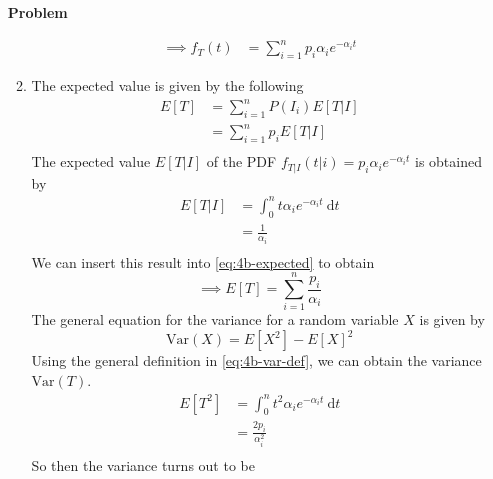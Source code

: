 \documentclass[12pt]{article}
\newenvironment{Ex}{\textbf{Problem}\vspace{.75em}\\}{}
\newcommand{\dd}[1]{\:\mathrm{d}{#1}}
\begin{document}
\begin{enumerate}
\begin{Ex}
\begin{solution}
\begin{enumerate}
\begin{equation}
\begin{aligned}
            \implies f_T(t) &= \sum_{i=1}^{n} p_i \alpha_i e^{-\alpha_i t}
          \end{aligned}
        \end{equation}
      \item The expected value is given by the following
        \begin{equation}
          \label{eq:4b-expected}
          \begin{aligned}
            E[T] &= \sum_{i=1}^n P(I_i)E[T|I] \\
            &= \sum_{i=1}^n p_i E[T|I] \\
          \end{aligned}
        \end{equation}
        The expected value $E[T|I]$ of the PDF $f_{T|I}(t|i)=p_i \alpha_i
        e^{-\alpha_i t}$ is obtained by
        \begin{equation}
          \label{eq:4b-expected-conditional}
          \begin{aligned}
            E[T|I] &= \int_0^{n} t \alpha_i e^{-\alpha_i t} \dd{t} \\
            &= \frac{1}{\alpha_i} \\
          \end{aligned}
        \end{equation}
        We can insert this result into \cref{eq:4b-expected} to obtain
        \begin{equation}
          \label{eq:4b-presol}
          \implies E[T] = \sum_{i=1}^n \frac{p_i}{\alpha_i}
        \end{equation}
        The general equation for the variance for a random variable
        $X$ is given by
        \begin{equation}
          \label{eq:4b-var-def}
          \text{Var}(X) = E[X^2] - E[X]^2
        \end{equation}
        Using the general definition in \cref{eq:4b-var-def}, we can
        obtain the variance $\text{Var}(T)$.
        \begin{equation}
          \label{eq:4b-var-inner}
          \begin{aligned}
            E[T^2] &= \int_0^{n} t^2 \alpha_i e^{-\alpha_i t} \dd{t} \\
            &= \frac{2 p_i}{\alpha_i^2} \\
          \end{aligned}
        \end{equation}
        So then the variance turns out to be
        \begin{equation}

\end{equation}
\end{enumerate}
\end{solution}
\end{Ex}
\end{enumerate}
\end{document}
